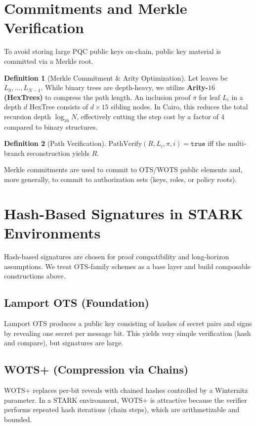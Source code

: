 \documentclass[conference]{IEEEtran}
\theoremstyle{definition}
\newtheorem{definition}{Definition}
\theoremstyle{plain}
\theoremstyle{remark}
\newcommand{\PathVerify}{\mathrm{PathVerify}}
\begin{document}
\section{Commitments and Merkle Verification}
To avoid storing large PQC public keys on-chain, public key material is committed via a Merkle root.

\begin{definition}[Merkle Commitment \& Arity Optimization]
Let leaves be $L_0,\dots,L_{N-1}$. While binary trees are depth-heavy, we utilize \textbf{Arity-$16$ (HexTrees)} to compress the path length. An inclusion proof $\pi$ for leaf $L_i$ in a depth $d$ HexTree consists of $d \times 15$ sibling nodes. In Cairo, this reduces the total recursion depth $\log_{16} N$, effectively cutting the step cost by a factor of 4 compared to binary structures.
\end{definition}

\begin{definition}[Path Verification]
$\PathVerify(R, L_i, \pi, i)=\texttt{true}$ iff the multi-branch reconstruction yields $R$.
\end{definition}

Merkle commitments are used to commit to OTS/WOTS public elements and, more generally, to commit to authorization sets (keys, roles, or policy roots).

\section{Hash-Based Signatures in STARK Environments}
Hash-based signatures are chosen for proof compatibility and long-horizon assumptions. We treat OTS-family schemes as a base layer and build composable constructions above.

\subsection{Lamport OTS (Foundation)}
Lamport OTS produces a public key consisting of hashes of secret pairs and signs by revealing one secret per message bit. This yields very simple verification (hash and compare), but signatures are large.

\subsection{WOTS+ (Compression via Chains)}
WOTS+ replaces per-bit reveals with chained hashes controlled by a Winternitz parameter. In a STARK environment, WOTS+ is attractive because the verifier performs repeated hash iterations (chain steps), which are arithmetizable and bounded.
\end{document}
